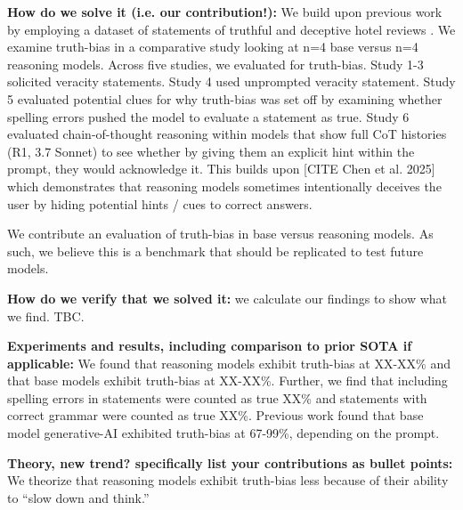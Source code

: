 \documentclass{article}
\begin{document}
\textbf{How do we solve it (i.e. our contribution!):} We build upon previous work by employing a dataset of statements of truthful and deceptive hotel reviews \citep{ott_finding_2011}. We examine truth-bias in a comparative study looking at n=4 base versus n=4 reasoning models. Across five studies, we evaluated for truth-bias. Study 1-3 solicited veracity statements. Study 4 used unprompted veracity statement. Study 5 evaluated potential clues for why truth-bias was set off by examining whether spelling errors pushed the model to evaluate a statement as true. Study 6 evaluated chain-of-thought reasoning within models that show full CoT histories (R1, 3.7 Sonnet) to see whether by giving them an explicit hint within the prompt, they would acknowledge it. This builds upon [CITE Chen et al. 2025] which demonstrates that reasoning models sometimes intentionally deceives the user by hiding potential hints / cues to correct answers. 

We contribute an evaluation of truth-bias in base versus reasoning models. As such, we believe this is a benchmark that should be replicated to test future models.

\textbf{How do we verify that we solved it:} we calculate our findings to show what we find. TBC.

\textbf{Experiments and results, including comparison to prior SOTA if applicable:} We found that reasoning models exhibit truth-bias at XX-XX\% and that base models exhibit truth-bias at XX-XX\%. Further, we find that including spelling errors in statements were counted as true XX\% and statements with correct grammar were counted as true XX\%. Previous work found that base model generative-AI exhibited truth-bias at 67-99\%, depending on the prompt. 


\textbf{Theory, new trend? specifically list your contributions as bullet points:} We theorize that reasoning models exhibit truth-bias less because of their ability to ``slow down and think.'' 
\end{document}
